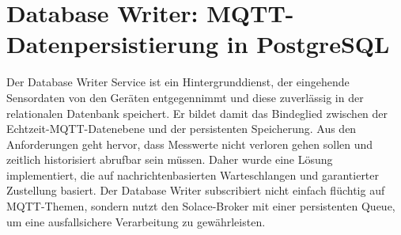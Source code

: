 \section{Database Writer: MQTT-Datenpersistierung in PostgreSQL}
Der Database Writer Service ist ein Hintergrunddienst, der eingehende Sensordaten von den Geräten entgegennimmt und diese zuverlässig in der relationalen Datenbank speichert. Er bildet damit das Bindeglied zwischen der Echtzeit-MQTT-Datenebene und der persistenten Speicherung. Aus den Anforderungen geht hervor, dass Messwerte nicht verloren gehen sollen und zeitlich historisiert abrufbar sein müssen. Daher wurde eine Lösung implementiert, die auf nachrichtenbasierten Warteschlangen und garantierter Zustellung basiert. Der Database Writer subscribiert nicht einfach flüchtig auf MQTT-Themen, sondern nutzt den Solace-Broker mit einer persistenten Queue, um eine ausfallsichere Verarbeitung zu gewährleisten.
